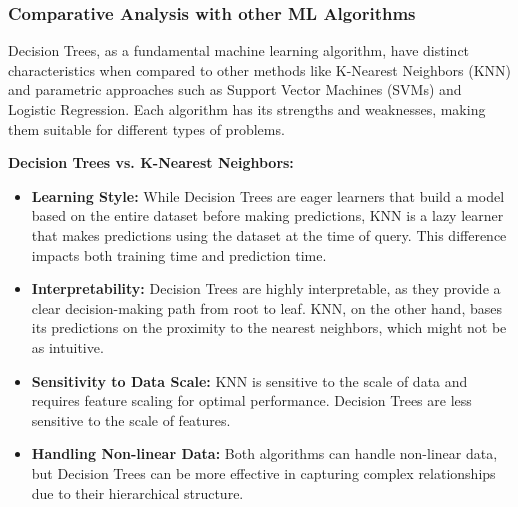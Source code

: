\documentclass[letterpaper,10pt]{article}
\begin{document}
\subsubsection{Comparative Analysis with other ML Algorithms} 
Decision Trees, as a fundamental machine learning algorithm, have distinct characteristics when compared to other methods like K-Nearest Neighbors (KNN) and parametric approaches such as Support Vector Machines (SVMs) and Logistic Regression. Each algorithm has its strengths and weaknesses, making them suitable for different types of problems. \par
\vspace{5pt}
\textbf{Decision Trees vs. K-Nearest Neighbors:}
\begin{itemize}
\item \textbf{Learning Style:} While Decision Trees are eager learners that build a model based on the entire dataset before making predictions, KNN is a lazy learner that makes predictions using the dataset at the time of query. This difference impacts both training time and prediction time.
\item \textbf{Interpretability:} Decision Trees are highly interpretable, as they provide a clear decision-making path from root to leaf. KNN, on the other hand, bases its predictions on the proximity to the nearest neighbors, which might not be as intuitive.

\item \textbf{Sensitivity to Data Scale:} KNN is sensitive to the scale of data and requires feature scaling for optimal performance. Decision Trees are less sensitive to the scale of features.

\item \textbf{Handling Non-linear Data:} Both algorithms can handle non-linear data, but Decision Trees can be more effective in capturing complex relationships due to their hierarchical structure.
\end{itemize}
\end{document}
